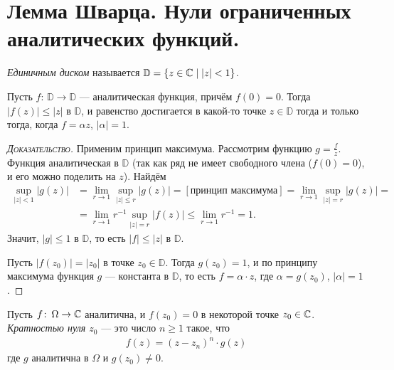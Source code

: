 \documentclass[../../main.tex]{subfiles}
\begin{document}
\newpage
\section{Лемма Шварца. Нули ограниченных аналитических функций.}

\begin{df*}
 \textit{Единичным диском} называется $ \mathbb D = \left\{ z \in \mathbb{C} \;\middle|\; \left| z \right| < 1 \right\} $.
\end{df*}

\begin{lm}[Шварца]
 Пусть $ f \colon\, \mathbb D \to \mathbb D $ --- аналитическая функция, причём $ f(0) = 0 $. Тогда $ \left| f(z) \right| \leqslant \left| z \right| $ в $ \mathbb D $, и равенство достигается в какой-то точке $ z \in \mathbb D $ тогда и только тогда, когда $f = \alpha z$, $ \left| \alpha  \right| = 1 $.
\end{lm}
\begin{proof}[\normalfont\textsc{Доказательство}]
 Применим принцип максимума. Рассмотрим функцию $ g=\frac{f}{z} $. Функция аналитическая в $ \mathbb D $ (так как ряд не имеет свободного члена ($ f(0) = 0 $), и его можно поделить на $ z $). Найдём
 \begin{align*}
  \sup_{\left| z \right| < 1} \left| g(z) \right| &= \lim_{r \to 1} \sup_{\left| z \right| \leqslant r} \left| g(z) \right| = [\text{принцип максимума}] = \lim_{r\to 1} \sup_{\left| z \right| = r} \left| g(z) \right| = \\
  &= \lim_{r \to 1} r^{-1} \sup_{\left| z \right| = r} \left| f(z) \right| \leqslant \lim_{r \to 1} r^{-1} = 1.
 \end{align*} Значит, $ \left| g \right| \leqslant 1 $ в $ \mathbb D $, то есть $ \left| f \right| \leqslant \left| z \right| $ в $ \mathbb D $.

 Пусть $ \left|f(z_0) \right| = \left| z_0 \right| $ в точке $ z_0 \in \mathbb D $. Тогда $ g(z_0) = 1 $, и по принципу максимума функция $ g $ --- константа в $ \mathbb D $, то есть $ f = \alpha \cdot z $, где $ \alpha = g(z_0) $, $ \left| \alpha \right|=1 $.
\end{proof}

\begin{df}
 Пусть $ f \colon\, \Omega \to \mathbb{C} $ аналитична, и $ f(z_0) = 0 $ в некоторой точке $ z_0 \in \mathbb{C} $. \textit{Кратностью нуля $ z_0 $} --- это число $ n \geqslant 1 $ такое, что
 \begin{align*}
  f(z) = (z-z_n)^{n} \cdot g(z)
 \end{align*} где $ g $ аналитична в $ \Omega $ и $ g(z_0) \neq 0 $.
\end{df}
\end{document}
